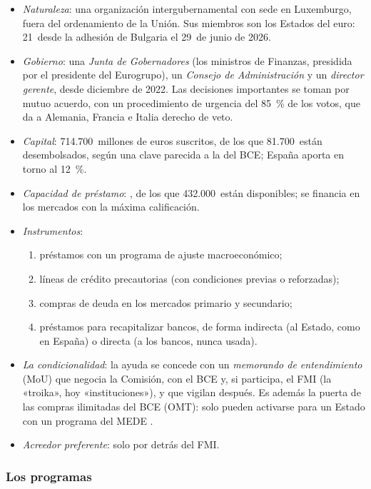 \documentclass[11pt]{article}
\begin{document}
\begin{itemize}
\item \emph{Naturaleza}: una organización intergubernamental con sede en Luxemburgo, fuera del ordenamiento de la Unión. Sus miembros son los Estados del euro: 21~desde la adhesión de Bulgaria el 29~de junio de 2026\nocite{MEDE2026Bulgaria}.
\item \emph{Gobierno}: una \emph{Junta de Gobernadores} (los ministros de Finanzas, presidida por el presidente del Eurogrupo), un \emph{Consejo de Administración} y un \emph{director gerente},  desde diciembre de 2022. Las decisiones importantes se toman por mutuo acuerdo, con un procedimiento de urgencia del 85~\% de los votos, que da a Alemania, Francia e Italia derecho de veto.
\item \emph{Capital}: 714.700~millones de euros suscritos, de los que 81.700~están desembolsados, según una clave parecida a la del BCE; España aporta en torno al 12~\%\nocite{MEDE2026Bulgaria}.
\item \emph{Capacidad de préstamo}: , de los que 432.000~están disponibles; se financia en los mercados con la máxima calificación\nocite{MEDE2026Inversores}.
\item \emph{Instrumentos}:
  \begin{enumerate}
  \item préstamos con un programa de ajuste macroeconómico;
  \item líneas de crédito precautorias (con condiciones previas o reforzadas);
  \item compras de deuda en los mercados primario y secundario;
  \item préstamos para recapitalizar bancos, de forma indirecta (al Estado, como en España) o directa (a los bancos, nunca usada).
  \end{enumerate}
\item \emph{La condicionalidad}: la ayuda se concede con un \emph{memorando de entendimiento} (MoU) que negocia la Comisión, con el BCE y, si participa, el FMI (la «troika», hoy «instituciones»), y que vigilan después. Es además la puerta de las compras ilimitadas del BCE (OMT): solo pueden activarse para un Estado con un programa del MEDE .
\item \emph{Acreedor preferente}: solo por detrás del FMI.
\end{itemize}

\subsubsection{Los programas}\label{sec:mede-programas}
\end{document}
